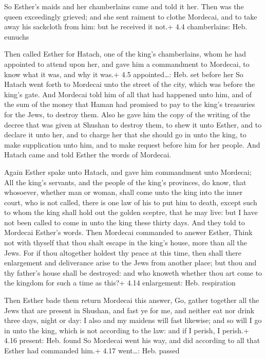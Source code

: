  So Esther's maids and her chamberlains came and told it
her. Then was the queen exceedingly grieved; and she sent raiment to
clothe Mordecai, and to take away his sackcloth from him: but he
received it not.+ 4.4 chamberlains: Heb. eunuchs

 Then called Esther for Hatach, one of the king's
chamberlains, whom he had appointed to attend upon her, and gave him a
commandment to Mordecai, to know what it was, and why it was.+ 4.5
appointed\ldots: Heb. set before her  So Hatach went forth
to Mordecai unto the street of the city, which was before the king's
gate.  And Mordecai told him of all that had happened unto
him, and of the sum of the money that Haman had promised to pay to the
king's treasuries for the Jews, to destroy them.  Also he
gave him the copy of the writing of the decree that was given at Shushan
to destroy them, to shew it unto Esther, and to declare it unto her, and
to charge her that she should go in unto the king, to make supplication
unto him, and to make request before him for her people. 
And Hatach came and told Esther the words of Mordecai.

 Again Esther spake unto Hatach, and gave him commandment
unto Mordecai;  All the king's servants, and the people of
the king's provinces, do know, that whosoever, whether man or woman,
shall come unto the king into the inner court, who is not called, there
is one law of his to put him to death, except such to whom the king
shall hold out the golden sceptre, that he may live: but I have not been
called to come in unto the king these thirty days.  And
they told to Mordecai Esther's words.  Then Mordecai
commanded to answer Esther, Think not with thyself that thou shalt
escape in the king's house, more than all the Jews.  For if
thou altogether holdest thy peace at this time, then shall there
enlargement and deliverance arise to the Jews from another place; but
thou and thy father's house shall be destroyed: and who knoweth whether
thou art come to the kingdom for such a time as this?+ 4.14 enlargement:
Heb. respiration

 Then Esther bade them return Mordecai this answer,
 Go, gather together all the Jews that are present in
Shushan, and fast ye for me, and neither eat nor drink three days, night
or day: I also and my maidens will fast likewise; and so will I go in
unto the king, which is not according to the law: and if I perish, I
perish.+ 4.16 present: Heb. found  So Mordecai went his
way, and did according to all that Esther had commanded him.+ 4.17
went\ldots: Heb. passed


